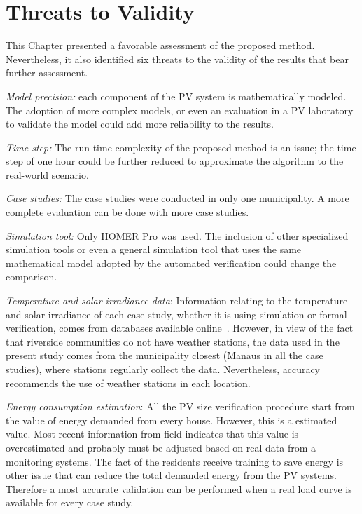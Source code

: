 \section{Threats to Validity}

This Chapter presented a favorable assessment of the proposed method. %
Nevertheless, it also identified six threats to the validity of the results that bear further assessment.

\textit{Model precision:} each component of the PV system is mathematically modeled. %
The adoption of more complex models, or even an evaluation in a PV laboratory to validate the model could add more reliability to the results.

\textit{Time step:} The run-time complexity of the proposed method is an issue; the time step of one hour could be further reduced to approximate the algorithm to the real-world scenario.

\textit{Case studies:} The case studies were conducted in only one municipality. A more complete evaluation can be done with more case studies.

\textit{Simulation tool:} Only HOMER Pro was used. The inclusion of other specialized simulation tools or even a general simulation tool that uses the same mathematical model adopted by the automated verification could change the comparison.

\textit{Temperature and solar irradiance data}: Information relating to the temperature and solar irradiance of each case study, whether it is using simulation or formal verification, comes from databases available online~\cite{Temperature, Irradiance}. However, in view of the fact that riverside communities do not have weather stations, the data used in the present study comes from the municipality closest (Manaus in all the case studies), where stations regularly collect the data. Nevertheless, accuracy recommends the use of weather stations in each location.

\textit{Energy consumption estimation}: All the PV size verification procedure start from the value of energy demanded from every house. However, this is a estimated value. Most recent information from field indicates that this value is overestimated and probably must be adjusted based on real data from a monitoring systems. The fact of the residents receive training to save energy is other issue that can reduce the total demanded energy from the PV systems. Therefore a most accurate validation can be performed when a real load curve is available for every case study.

